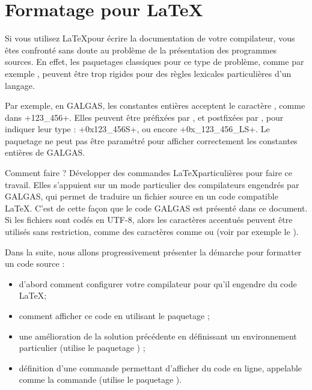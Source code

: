
\chapter{Formatage pour LaTeX}

Si vous utilisez \LaTeX pour écrire la documentation de votre compilateur, vous êtes confronté sans doute au problème de la présentation des programmes sources. En effet, les paquetages classiques pour ce type de problème, comme par exemple , peuvent être trop rigides pour des règles lexicales particulières d'un langage.

Par exemple, en GALGAS, les constantes entières acceptent le caractère \tpp{\_}, comme dans \ggs+123_456+. Elles peuvent être préfixées par , et postfixées par ,  pour indiquer leur type : \ggs+0x123_456S+, ou encore \ggs+0x_123_456_LS+. Le paquetage  ne peut pas être paramétré pour afficher correctement les constantes entières de GALGAS.

Comment faire ? Développer des commandes \LaTeX particulières pour faire ce travail. Elles s'appuient sur un mode particulier des compilateurs engendrés par GALGAS, qui permet de traduire un fichier source en un code compatible \LaTeX. C'est de cette façon que le code GALGAS est présenté dans ce document. Si les fichiers  sont codés en UTF-8, alors les caractères accentués peuvent être utilisés sans restriction, comme des caractères comme  ou  (voir par exemple le ).

Dans la suite, nous allons progressivement présenter la démarche pour formatter un code source :
\begin{itemize}
  \item d'abord comment configurer votre compilateur pour qu'il engendre du code \LaTeX ;
  \item comment afficher ce code en utilisant le paquetage  ;
  \item une amélioration de la solution précédente en définissant un environnement particulier (utilise le paquetage ) ;
  \item définition d'une commande permettant d'afficher du code en ligne, appelable comme la commande  (utilise le paquetage ).
\end{itemize}

